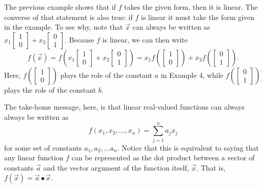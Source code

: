 \documentclass[../book.tex]{subfiles}
\begin{document}
The previous example shows that if \(f\) takes the given form, then it is linear. The converse of that statement is also true: if \(f\) is linear it must take the form given in the example. To see why, note that \(\vec x\) can always be written as \(x_1 \begin{bmatrix} 1\\ 0 \end{bmatrix}  + x_2 \begin{bmatrix} 0\\1 \end{bmatrix}\). Because \(f\) is linear, we can then write
\begin{equation}\label{eq:vec-22}
f ( \vec x)
=
f\left(x_1 \begin{bmatrix}
    1\\ 0
    \end{bmatrix}  + x_2 \begin{bmatrix}
    0\\1
\end{bmatrix} \right)
= 
x_1 
f\left( \begin{bmatrix}
    1\\ 0
    \end{bmatrix} \right) + x_2 f\left( \begin{bmatrix}
    0\\1
\end{bmatrix} \right).
\end{equation}
Here, \(f\left( \begin{bmatrix} 1\\ 0 \end{bmatrix} \right)\) plays the role of the constant \(a\) in Example 4, while \(f\left( \begin{bmatrix} 0\\ 1 \end{bmatrix} \right)\) plays the role of the constant \(b\).

The take-home message, here, is that linear real-valued functions can always always be written as
\begin{equation}\label{eq:vec-23}
f(x_1, x_2, \ldots, x_n) = \sum_{j=1}^{n} a_{j}  x_{j}
\end{equation}
for some set of constants \(a_1, a_2, \ldots a_n\). Notice that this is equivalent to saying that any linear function \(f\) can be represented as the dot product between a vector of constants \(\vec{a}\) and the vector argument of the function itself, \(\vec{x}\). That is, \(f(\vec{x}) = \vec{a}\bullet\vec{x}\).
\end{document}
